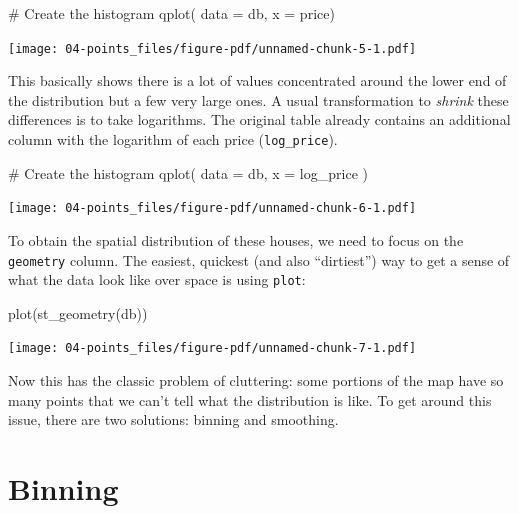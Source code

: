 \documentclass[
  letterpaper,
  DIV=11,
  numbers=noendperiod,
  oneside]{scrreprt}
\newenvironment{Shaded}{\begin{snugshade}}{\end{snugshade}}
\newcommand{\AttributeTok}[1]{\textcolor[rgb]{0.40,0.45,0.13}{#1}}
\newcommand{\CommentTok}[1]{\textcolor[rgb]{0.37,0.37,0.37}{#1}}
\newcommand{\FunctionTok}[1]{\textcolor[rgb]{0.28,0.35,0.67}{#1}}
\newcommand{\NormalTok}[1]{\textcolor[rgb]{0.00,0.23,0.31}{#1}}
\begin{document}
\begin{Shaded}
\begin{Highlighting}[]
\CommentTok{\# Create the histogram}
\FunctionTok{qplot}\NormalTok{( }\AttributeTok{data =}\NormalTok{ db, }\AttributeTok{x =}\NormalTok{ price)}
\end{Highlighting}
\end{Shaded}

\texttt{[image: 04-points\_files/figure-pdf/unnamed-chunk-5-1.pdf]}

This basically shows there is a lot of values concentrated around the
lower end of the distribution but a few very large ones. A usual
transformation to \emph{shrink} these differences is to take logarithms.
The original table already contains an additional column with the
logarithm of each price (\texttt{log\_price}).

\begin{Shaded}
\begin{Highlighting}[]
\CommentTok{\# Create the histogram}
\FunctionTok{qplot}\NormalTok{( }\AttributeTok{data =}\NormalTok{ db, }\AttributeTok{x =}\NormalTok{ log\_price )}
\end{Highlighting}
\end{Shaded}

\texttt{[image: 04-points\_files/figure-pdf/unnamed-chunk-6-1.pdf]}

To obtain the spatial distribution of these houses, we need to focus on
the \texttt{geometry} column. The easiest, quickest (and also
``dirtiest'') way to get a sense of what the data look like over space
is using \texttt{plot}:

\begin{Shaded}
\begin{Highlighting}[]
\FunctionTok{plot}\NormalTok{(}\FunctionTok{st\_geometry}\NormalTok{(db))}
\end{Highlighting}
\end{Shaded}

\texttt{[image: 04-points\_files/figure-pdf/unnamed-chunk-7-1.pdf]}

Now this has the classic problem of cluttering: some portions of the map
have so many points that we can't tell what the distribution is like. To
get around this issue, there are two solutions: binning and smoothing.

\section{Binning}\label{binning}
\end{document}
